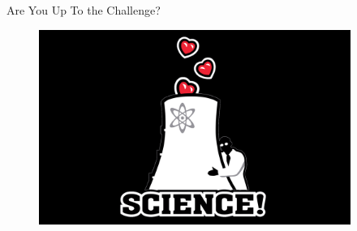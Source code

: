 \documentclass[xcolor=x11names,compress, handout]{beamer}
\renewcommand{\(}{\begin{columns}}
\renewcommand{\)}{\end{columns}}
\newcommand{\<}[1]{\begin{column}{#1}}
\renewcommand{\>}{\end{column}}
\begin{document}
%
%

\begin{frame}{Are You Up To the Challenge?}
\begin{figure}
\includegraphics[height=2.5in,clip]{../figs/science}
\end{figure}
\end{frame}
\end{document}
